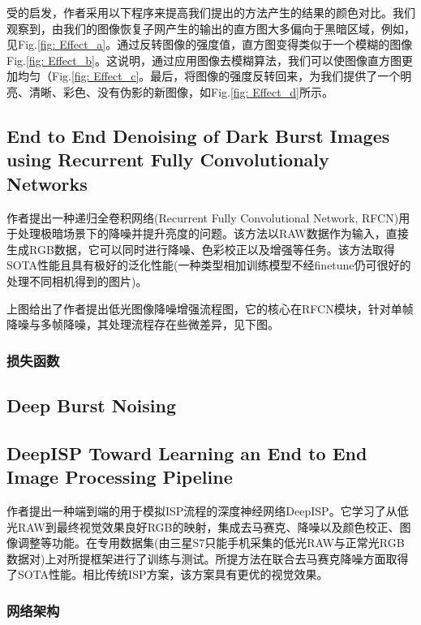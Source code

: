 \documentclass[letterpaper,12pt]{article}
\begin{document}
		受\cite{dong2010fast}的启发，作者采用以下程序来提高我们提出的方法产生的结果的颜色对比。我们观察到，由我们的图像恢复子网产生的输出的直方图大多偏向于黑暗区域，例如，见Fig.\ref{fig: Effect_a}。通过反转图像的强度值，直方图变得类似于一个模糊的图像Fig.\ref{fig: Effect_b}。这说明，通过应用图像去模糊算法\cite{he2010single}，我们可以使图像直方图更加均匀（Fig.\ref{fig: Effect_c}。最后，将图像的强度反转回来，为我们提供了一个明亮、清晰、彩色、没有伪影的新图像，如Fig.\ref{fig: Effect_d}所示。
		
	\subsection{End to End Denoising of Dark Burst Images using Recurrent Fully Convolutionaly Networks}
	
	作者提出一种递归全卷积网络(Recurrent Fully Convolutional Network, RFCN)用于处理极暗场景下的降噪并提升亮度的问题。该方法以RAW数据作为输入，直接生成RGB数据，它可以同时进行降噪、色彩校正以及增强等任务。该方法取得SOTA性能且具有极好的泛化性能(一种类型相加训练模型不经finetune仍可很好的处理不同相机得到的图片)。
	
	上图给出了作者提出低光图像降噪增强流程图，它的核心在RFCN模块，针对单帧降噪与多帧降噪，其处理流程存在些微差异，见下图。
	
		\subsubsection{损失函数}
	
	\subsection{Deep Burst Noising}
	\subsection{DeepISP Toward Learning an End to End Image Processing Pipeline}
	
	作者提出一种端到端的用于模拟ISP流程的深度神经网络DeepISP。它学习了从低光RAW到最终视觉效果良好RGB的映射，集成去马赛克、降噪以及颜色校正、图像调整等功能。在专用数据集(由三星S7只能手机采集的低光RAW与正常光RGB数据对)上对所提框架进行了训练与测试。所提方法在联合去马赛克降噪方面取得了SOTA性能。相比传统ISP方案，该方案具有更优的视觉效果。
	
		\subsubsection{网络架构}
		
\end{document}
